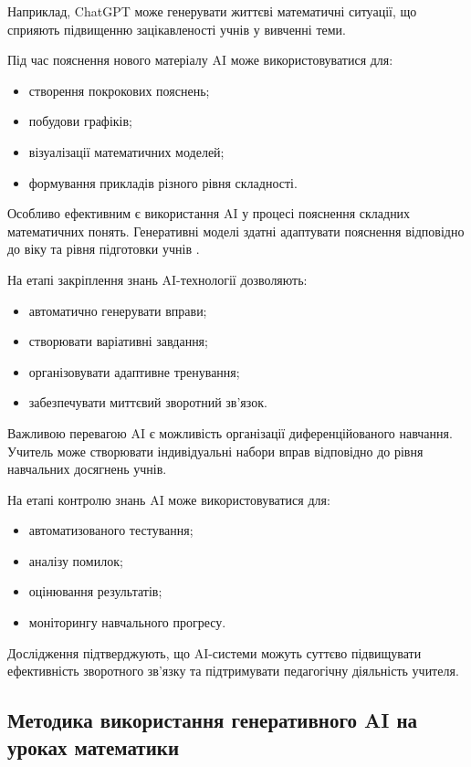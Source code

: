 Наприклад, ChatGPT може генерувати життєві математичні ситуації, що сприяють підвищенню зацікавленості учнів у вивченні теми.

Під час пояснення нового матеріалу AI може використовуватися для:
\begin{itemize}
\item створення покрокових пояснень;
\item побудови графіків;
\item візуалізації математичних моделей;
\item формування прикладів різного рівня складності.
\end{itemize}

Особливо ефективним є використання AI у процесі пояснення складних математичних понять. Генеративні моделі здатні адаптувати пояснення відповідно до віку та рівня підготовки учнів \cite{Walkington2025}.

На етапі закріплення знань AI-технології дозволяють:
\begin{itemize}
\item автоматично генерувати вправи;
\item створювати варіативні завдання;
\item організовувати адаптивне тренування;
\item забезпечувати миттєвий зворотний зв’язок.
\end{itemize}

Важливою перевагою AI є можливість організації диференційованого навчання. Учитель може створювати індивідуальні набори вправ відповідно до рівня навчальних досягнень учнів.

На етапі контролю знань AI може використовуватися для:
\begin{itemize}
\item автоматизованого тестування;
\item аналізу помилок;
\item оцінювання результатів;
\item моніторингу навчального прогресу.
\end{itemize}

Дослідження \cite{Demszky2025} підтверджують, що AI-системи можуть суттєво підвищувати ефективність зворотного зв’язку та підтримувати педагогічну діяльність учителя.

\subsection{Методика використання генеративного AI на уроках математики}


